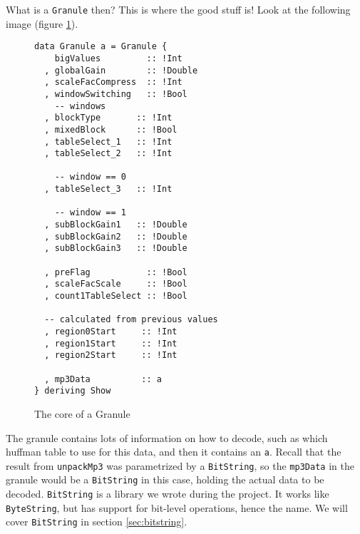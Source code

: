 \documentclass[a4paper,12pt]{article}
\begin{document}
    What is a \texttt{Granule} then? This is where the good stuff is! Look at
    the following image (figure \ref{fig:granule_type}).
\begin{figure}[H]
  \begin{center}
    \begin{lstlisting}
data Granule a = Granule {
    bigValues         :: !Int
  , globalGain        :: !Double
  , scaleFacCompress  :: !Int
  , windowSwitching   :: !Bool
    -- windows
  , blockType       :: !Int
  , mixedBlock      :: !Bool
  , tableSelect_1   :: !Int
  , tableSelect_2   :: !Int

    -- window == 0
  , tableSelect_3   :: !Int

    -- window == 1
  , subBlockGain1   :: !Double
  , subBlockGain2   :: !Double
  , subBlockGain3   :: !Double

  , preFlag           :: !Bool
  , scaleFacScale     :: !Bool
  , count1TableSelect :: !Bool

  -- calculated from previous values
  , region0Start     :: !Int
  , region1Start     :: !Int
  , region2Start     :: !Int

  , mp3Data          :: a
} deriving Show
    \end{lstlisting}
    \caption{The core of a Granule}\label{fig:granule_type}
  \end{center}
\end{figure}

    The granule contains lots of information on how to decode, such as which
    huffman table to use for this data,  and then it contains an \texttt{a}.
    Recall that the result from \texttt{unpackMp3} was parametrized by a
    \texttt{BitString}, so the \texttt{mp3Data} in the granule would be a
    \texttt{BitString} in this case, holding the actual data to be decoded.
    \texttt{BitString} is a library we wrote during the project. It works like
    \texttt{ByteString}, but has support for bit-level operations, hence the
    name. We will cover \texttt{BitString} in section \ref{sec:bitstring}.
\end{document}
